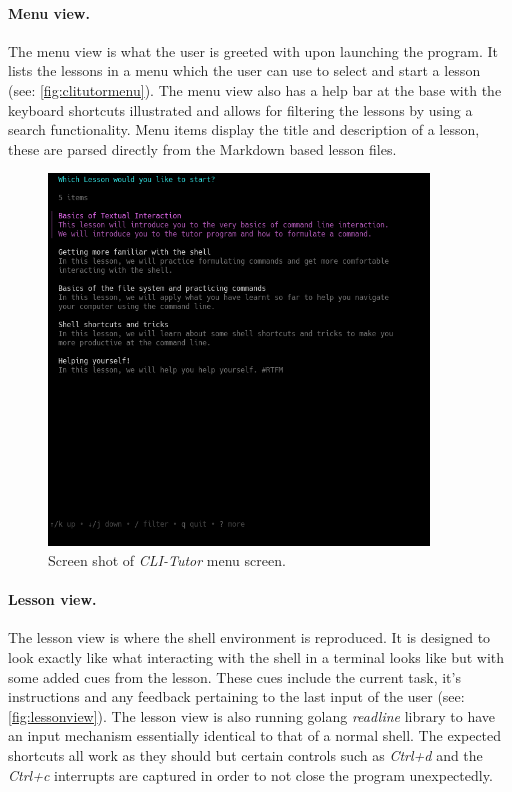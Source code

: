 \paragraph{Menu view.} The menu view is what the user is greeted with upon
launching the program. It lists the lessons in a menu which the user can use to
select and start a lesson (see: \autoref{fig:clitutormenu}). The menu view also
has a help bar at the base with the keyboard shortcuts illustrated and allows
for filtering the lessons by using a search functionality. Menu items display
the title and description of a lesson, these are parsed directly from the
Markdown based lesson files.

\begin{figure}[htbp]
    \centering
    \includegraphics[width=0.9\textwidth]{img/menushort}
    \caption{Screen shot of \textit{CLI-Tutor} menu screen.}
    \label{fig:clitutormenu}
\end{figure}


\paragraph{Lesson view.} The lesson view is where the shell environment is
reproduced. It is designed to look exactly like what interacting with the shell
in a terminal looks like but with some added cues from the lesson. These cues
include the current task, it's instructions and any feedback pertaining to the
last input of the user (see: \autoref{fig:lessonview}). The lesson view is also
running golang \textit{readline} library to have an input mechanism essentially
identical to that of a normal shell. The expected shortcuts all work as they
should but certain controls such as \textit{Ctrl+d} and the  \textit{Ctrl+c}
interrupts are captured in order to not close the program unexpectedly. 

